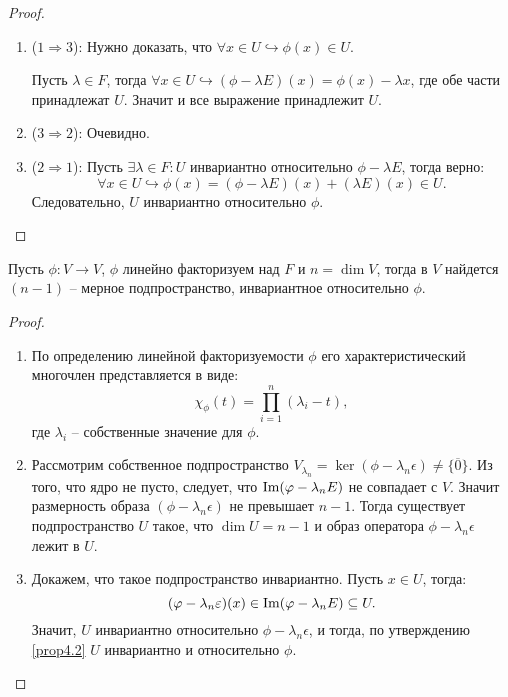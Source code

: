 \begin{proof}~
    \begin{enumerate}
        \item ($1 \Rightarrow 3$): Нужно доказать, что $\forall x \in U \hookrightarrow \phi(x) \in U$. 
        
        Пусть $\lambda \in F$, тогда $\forall x \in U \hookrightarrow (\phi - \lambda E)(x) = \phi(x) - \lambda x$, 
        где обе части принадлежат $U$. Значит и все выражение принадлежит $U$.
        \item ($3 \Rightarrow 2$): Очевидно.
        \item ($2 \Rightarrow 1$): Пусть $\exists \lambda \in F: U$ инвариантно относительно 
        $\phi - \lambda E$, тогда верно: 
        $$\forall x \in U \hookrightarrow \phi(x) = (\phi - \lambda E)(x) + (\lambda E)(x) \in U.$$
        Следовательно, $U$ инвариантно относительно $\phi$.
    \end{enumerate}
\end{proof}

\begin{proposition}
    \label{utv4.3}
    Пусть $\phi: V \to V$, $\phi$ линейно факторизуем над $F$ и  $n = \dim V$, тогда в $V$ найдется 
    $(n - 1)$ -- мерное подпространство, инвариантное относительно $\phi$.
\end{proposition}

\begin{proof}~
    \begin{enumerate}
        \item 
        По определению линейной факторизуемости $\phi$ его характеристический многочлен представляется в виде:
        $$\chi_{\phi}(t) = \prod_{i=1}^n (\lambda_i - t),$$ 
        где $\lambda_i$ -- собственные значение для $\phi$.
        \item 
        Рассмотрим собственное подпространство $V_{\lambda_n} = \ker (\phi - \lambda_n \epsilon) \neq \{ \overline{0} \}$. 
        Из того, что ядро не пусто, следует, что $\operatorname{Im}(\varphi - \lambda_n E)$ не совпадает с $V$. Значит 
        размерность образа $(\phi - \lambda_n \epsilon)$ не превышает $n - 1$. 
        Тогда существует подпространство $U$ такое, что $\dim U = n - 1$ и образ оператора 
        $\phi - \lambda_n \epsilon$ 
        лежит в $U$. 
        \item 
        Докажем, что такое подпространство инвариантно. Пусть $x \in U$, тогда: 
        $$(\varphi - \lambda_n \varepsilon)(x) \in \operatorname{Im}(\varphi - \lambda_n E) \subseteq U.$$ 
        Значит, $U$ инвариантно относительно $\phi - \lambda_n \epsilon$, и тогда, по утверждению 
        \ref{prop4.2} $U$ инвариантно и относительно $\phi$.
    \end{enumerate}
\end{proof}

